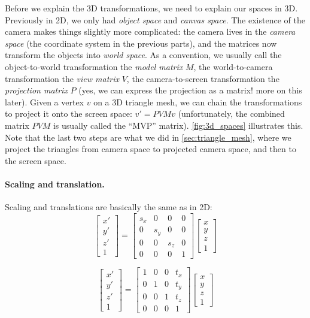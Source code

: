 Before we explain the 3D transformations, we need to explain our spaces in 3D. Previously in 2D, we only had \emph{object space} and \emph{canvas space}. The existence of the camera makes things slightly more complicated: the camera lives in the \emph{camera space} (the coordinate system in the previous parts), and the matrices now transform the objects into \emph{world space}. As a convention, we usually call the object-to-world transformation the \emph{model matrix} $M$, the world-to-camera transformation the \emph{view matrix} $V$, the camera-to-screen transformation the \emph{projection matrix} $P$ (yes, we can express the projection as a matrix! more on this later). Given a vertex $v$ on a 3D triangle mesh, we can chain the transformations to project it onto the screen space: $v'=PVMv$ (unfortunately, the combined matrix $PVM$ is usually called the ``MVP'' matrix). \cref{fig:3d_spaces} illustrates this. Note that the last two steps are what we did in \cref{sec:triangle_mesh}, where we project the triangles from camera space to projected camera space, and then to the screen space. 

\paragraph{Scaling and translation.} Scaling and translations are basically the same as in 2D:
\begin{equation}
\begin{bmatrix}
x' \\
y' \\
z' \\
1
\end{bmatrix}
=
\begin{bmatrix}
s_x & 0 & 0 & 0 \\
0 & s_y & 0 & 0 \\
0 & 0 & s_z & 0 \\
0 & 0 & 0 & 1
\end{bmatrix}
\begin{bmatrix}
x \\
y \\
z \\
1
\end{bmatrix}
\end{equation}

\begin{equation}
\begin{bmatrix}
x' \\
y' \\
z' \\
1
\end{bmatrix}
=
\begin{bmatrix}
1 & 0 & 0 & t_x \\
0 & 1 & 0 & t_y \\
0 & 0 & 1 & t_z \\
0 & 0 & 0 & 1
\end{bmatrix}
\begin{bmatrix}
x \\
y \\
z \\
1
\end{bmatrix}
\end{equation}

